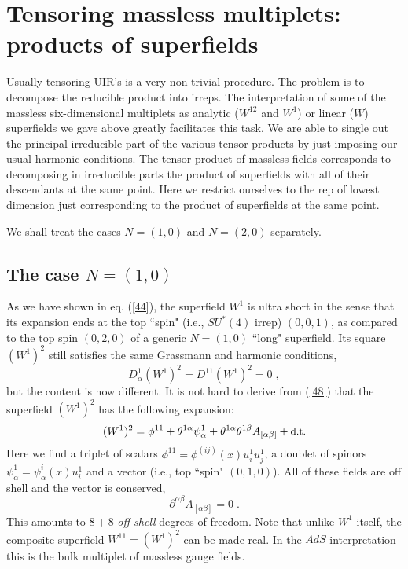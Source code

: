 \documentclass[a4paper,12pt]{article}
\begin{document}
\section{Tensoring massless multiplets: products of superfields}


Usually tensoring UIR's is a very non-trivial procedure. The 
problem is to decompose the reducible product into irreps.  The 
interpretation of some of the massless six-dimensional multiplets 
as analytic ($W^{12}$ and $W^1$) or linear ($W$) superfields we 
gave above greatly facilitates this task. We are able to single 
out the principal irreducible part of the various tensor products 
by just imposing our usual harmonic conditions. The tensor product 
of massless fields corresponds to decomposing
in irreducible parts the product of superfields with all of their 
descendants at the same point. Here we restrict ourselves to the rep of lowest
dimension just corresponding to the product of superfields at the same point.

We shall treat the 
cases $N=(1,0)$ and $N=(2,0)$ separately.  


\subsection{The case $N=(1,0)$}

As we have shown in eq. (\ref{44}), the superfield $W^1$ is ultra 
short in the sense that its expansion ends at the top ``spin" 
(i.e., $SU^*(4)$ irrep) $(0,0,1)$, as compared to the top spin 
$(0,2,0)$ of a generic $N=(1,0)$ ``long" superfield. Its square 
$(W^1)^2$ still satisfies the same Grassmann and harmonic 
conditions, 
\begin{equation}\label{48}
  D^1_\alpha (W^1)^2 = D^{11} (W^1)^2 =0\;,
\end{equation}
but the content is now different. It is not hard to derive from 
(\ref{48}) that the superfield $(W^1)^2$ has the following 
expansion: 
\begin{equation}\label{49}
  (W^1)^2 = \phi^{11} + \theta^{1\alpha}\psi^1_\alpha + 
\theta^{1\alpha}\theta^{1\beta} A_{[\alpha\beta]} + \mbox{\small 
d.t.} 
\end{equation}
Here we find a triplet of scalars  
$\phi^{11}=\phi^{(ij)}(x)u^1_iu^1_j$, a doublet of spinors 
$\psi^1_\alpha = \psi^i_\alpha(x)u^1_i$ and a vector (i.e., top 
``spin" $(0,1,0)$). All of these fields are off shell and the 
vector is conserved, 
\begin{equation}\label{50}
  \partial^{\alpha\beta} A_{[\alpha\beta]} = 0\;.
\end{equation}
This amounts to $8+8$ {\it off-shell} degrees of freedom. Note 
that unlike $W^1$ itself, the composite superfield 
$W^{11}=(W^1)^2$ can be made real. In the $AdS$ interpretation this is the bulk
multiplet of massless gauge fields.
\end{document}
